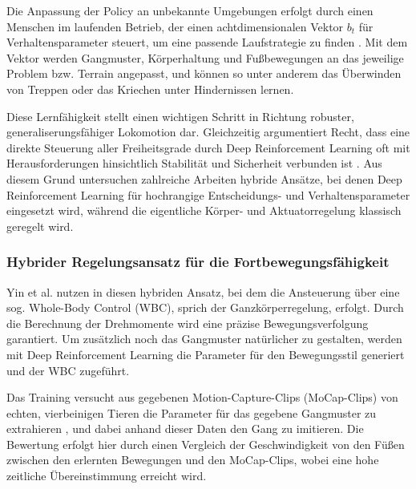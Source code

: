 Die Anpassung der Policy an unbekannte Umgebungen erfolgt durch einen Menschen im laufenden Betrieb, der einen achtdimensionalen Vektor $b_t$ für Verhaltensparameter steuert, um eine passende Laufstrategie zu finden \cite{margolisWalkTheseWays2022}. Mit dem Vektor werden Gangmuster, Körperhaltung und Fußbewegungen an das jeweilige Problem bzw. Terrain angepasst, und können so unter anderem das Überwinden von Treppen oder das Kriechen unter Hindernissen lernen.

\par\vspace{1em}

Diese Lernfähigkeit stellt einen wichtigen Schritt in Richtung robuster, generaliserungsfähiger Lokomotion dar. Gleichzeitig argumentiert Recht, dass eine direkte Steuerung aller Freiheitsgrade durch Deep Reinforcement Learning oft mit Herausforderungen hinsichtlich Stabilität und Sicherheit verbunden ist \cite{rechtTourReinforcementLearning2018}. Aus diesem Grund untersuchen zahlreiche Arbeiten hybride Ansätze, bei denen Deep Reinforcement Learning für hochrangige Entscheidungs- und Verhaltensparameter eingesetzt wird, während die eigentliche Körper- und Aktuatorregelung klassisch geregelt wird.

\subsubsection{Hybrider Regelungsansatz für die Fortbewegungsfähigkeit}
Yin et al. nutzen in \cite{yinRunDogLearning2021} diesen hybriden Ansatz, bei dem die Ansteuerung über eine sog. Whole-Body Control (WBC), sprich der Ganzkörperregelung, erfolgt. Durch die Berechnung der Drehmomente wird eine präzise Bewegungsverfolgung garantiert. Um zusätzlich noch das Gangmuster natürlicher zu gestalten, werden mit Deep Reinforcement Learning die Parameter für den Bewegungsstil generiert und der WBC zugeführt. 

Das Training versucht aus gegebenen Motion-Capture-Clips (MoCap-Clips) von echten, vierbeinigen Tieren die Parameter für das gegebene Gangmuster zu extrahieren \cite{yinRunDogLearning2021}, und dabei anhand dieser Daten den Gang zu imitieren. Die Bewertung erfolgt hier durch einen Vergleich der Geschwindigkeit von den Füßen zwischen den erlernten Bewegungen und den MoCap-Clips, wobei eine hohe zeitliche Übereinstimmung erreicht wird.

\par\vspace{1em}

